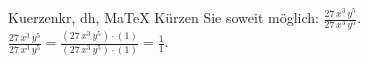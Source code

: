 \begin{MAufgabe}{Kuerzen}{kr, dh, MaTeX}
K\"urzen Sie soweit m\"oglich: $\frac{27\, x^3\, y^5}{27\, x^3\, y^5}$.\\ 
\ifLsg\MLoesung
\quad $\frac{27\, x^3\, y^5}{27\, x^3\, y^5}=\frac{(27\, x^3\, y^5)\cdot(1)}{(27\, x^3\, y^5)\cdot(1)}=\frac{1}{1}$.\else\relax\fi
 \end{MAufgabe}